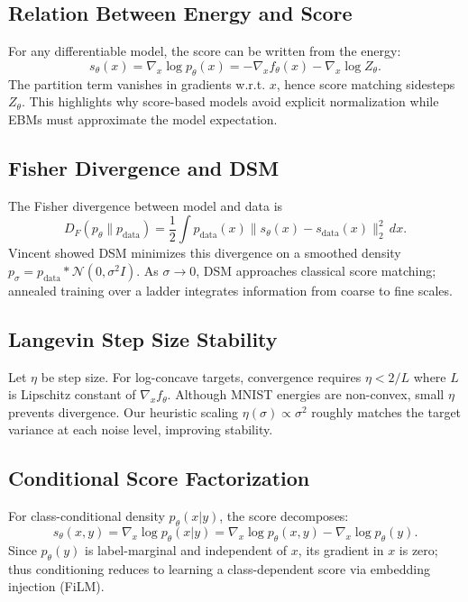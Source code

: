 \documentclass[a4paper,12pt]{article}
\begin{document}
\subsection{Relation Between Energy and Score}
For any differentiable model, the score can be written from the energy:
\begin{equation}
    s_\theta(x) = \nabla_x \log p_\theta(x) = - \nabla_x f_\theta(x) - \nabla_x \log Z_\theta.
\end{equation}
The partition term vanishes in gradients w.r.t. $x$, hence score matching sidesteps $Z_\theta$. This highlights why score-based models avoid explicit normalization while EBMs must approximate the model expectation.

\subsection{Fisher Divergence and DSM}
The Fisher divergence between model and data is
\begin{equation}
    D_F(p_\theta \| p_{\text{data}}) = \frac{1}{2}\int p_{\text{data}}(x) \| s_\theta(x) - s_{\text{data}}(x) \|_2^2 \, dx.
\end{equation}
Vincent showed DSM minimizes this divergence on a smoothed density $p_\sigma = p_{\text{data}} * \mathcal{N}(0, \sigma^2 I)$. As $\sigma \to 0$, DSM approaches classical score matching; annealed training over a ladder integrates information from coarse to fine scales.

\subsection{Langevin Step Size Stability}
Let $\eta$ be step size. For log-concave targets, convergence requires $\eta < 2/L$ where $L$ is Lipschitz constant of $\nabla_x f_\theta$. Although MNIST energies are non-convex, small $\eta$ prevents divergence. Our heuristic scaling $\eta(\sigma) \propto \sigma^2$ roughly matches the target variance at each noise level, improving stability.

\subsection{Conditional Score Factorization}
For class-conditional density $p_\theta(x|y)$, the score decomposes:
\begin{equation}
    s_\theta(x, y) = \nabla_x \log p_\theta(x|y) = \nabla_x \log p_\theta(x, y) - \nabla_x \log p_\theta(y).
\end{equation}
Since $p_\theta(y)$ is label-marginal and independent of $x$, its gradient in $x$ is zero; thus conditioning reduces to learning a class-dependent score via embedding injection (FiLM).
\end{document}
